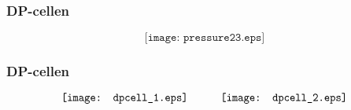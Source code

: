 \documentclass[aspectratio=169,xcolor=dvipsnames]{beamer}
\begin{document}
%
%
%
%
%
%
%
%
%
\begin{frame}
	\frametitle{DP-cellen}

	$$\texttt{[image: pressure23.eps]}$$
\end{frame}

%
%
\begin{frame}
	\frametitle{DP-cellen}

$$\texttt{[image: dpcell\_1.eps]} \hskip 30pt \texttt{[image: dpcell\_2.eps]}$$
\end{frame}
\end{document}
